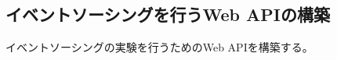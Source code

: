 \documentclass[../../../main]{subfiles}
\begin{document}
    \subsection{イベントソーシングを行うWeb APIの構築}\label{subsec:method-event_sourcing_api}

    イベントソーシングの実験を行うためのWeb APIを構築する。
\end{document}
